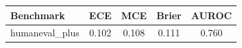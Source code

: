 \begin{tabular}{lcccc}
\toprule
Benchmark & ECE & MCE & Brier & AUROC \\
\midrule
humaneval_plus & 0.102 & 0.108 & 0.111 & 0.760 \\
\bottomrule
\end{tabular}
